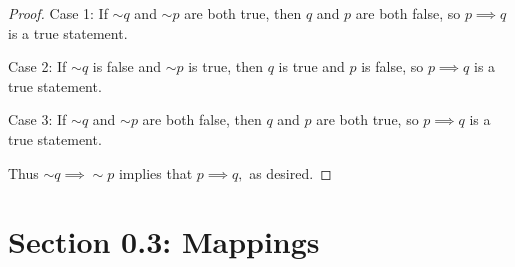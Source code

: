 \documentclass{article}
\begin{document}
\begin{itemize}
\begin{proof}
			Case 1: If $\sim q$ and $\sim p$ are both true, then $q$ and $p$ are both false, so $p\implies q$ is a true statement.

			Case 2: If $\sim q$ is false and $\sim p$ is true, then $q$ is true and $p$ is false, so $p\implies q$ is a true statement.

			Case 3: If $\sim q$ and $\sim p$ are both false, then $q$ and $p$ are both true, so $p\implies q$ is a true statement.

			Thus $\sim q\implies \sim p$ implies that $p\implies q,$ as desired.

		\end{proof}
\end{itemize}

\section*{Section 0.3: Mappings}
\end{document}

